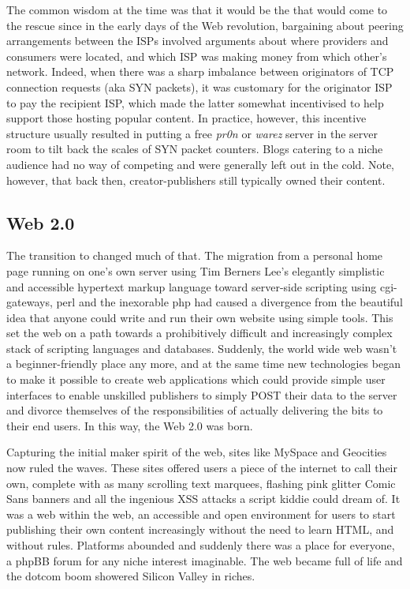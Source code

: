 The common wisdom at the time was that it would be the  that would come to the rescue since in the early days of the Web revolution, bargaining about peering arrangements between the ISPs involved arguments about where providers and consumers were located, and which ISP was making money from which other's network. Indeed, when there was a sharp imbalance between originators of TCP connection requests (aka SYN packets), it was customary for the originator ISP to pay the recipient ISP, which made the latter somewhat incentivised to help support those hosting popular content. In practice, however, this incentive structure usually resulted in putting a free \emph{pr0n} or \emph{warez} server in the server room to tilt back the scales of SYN packet counters. Blogs catering to a niche audience had no way of competing and were generally left out in the cold. Note, however, that back then, creator-publishers still typically owned their content.

\subsection{Web 2.0 \statusgreen}\label{sec:web_2}

The transition to  changed much of that. The migration from a personal home page running on one's own server using Tim Berners Lee's elegantly simplistic and accessible hypertext markup language toward server-side scripting using cgi-gateways, perl and the inexorable php had caused a divergence from the beautiful idea that anyone could write and run their own website using simple tools. This set the web on a path towards a prohibitively difficult and increasingly complex stack of scripting languages and databases. Suddenly, the world wide web wasn't a beginner-friendly place any more, and at the same time new technologies began to make it possible to create web applications which could provide simple user interfaces to enable unskilled publishers to simply POST their data to the server and divorce themselves of the responsibilities of actually delivering the bits to their end users. In this way, the Web 2.0 was born.

Capturing the initial maker spirit of the web, sites like MySpace and Geocities now ruled the waves. These sites offered users a piece of the internet to call their own, complete with as many scrolling text marquees, flashing pink glitter Comic Sans banners and all the ingenious XSS attacks a script kiddie could dream of. It was a web within the web, an accessible and open environment for users to start publishing their own content increasingly without the need to learn HTML, and without rules. Platforms abounded and suddenly there was a place for everyone, a phpBB forum for any niche interest imaginable. The web became full of life and the dotcom boom showered Silicon Valley in riches.


